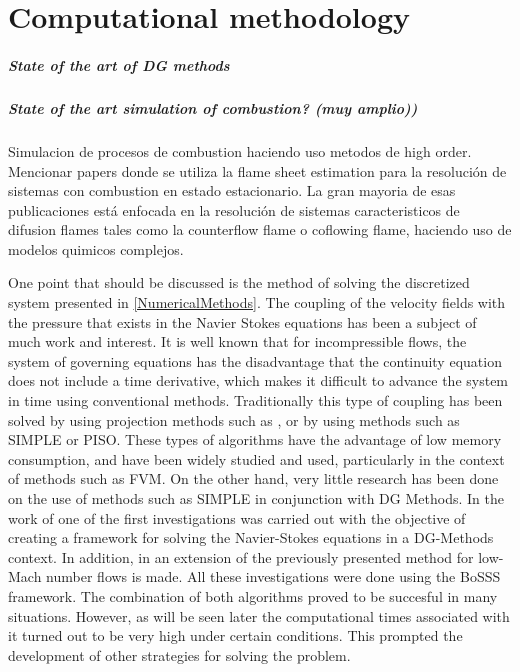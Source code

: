\chapter{Computational methodology} \label{ch:CompMethodology}

\paragraph{State of the art of DG methods}

\paragraph{State of the art simulation of combustion? (muy amplio))}
Simulacion de procesos de combustion haciendo uso metodos de high order. Mencionar papers donde se utiliza la flame sheet estimation para la resolución de sistemas con combustion en estado estacionario. La gran mayoria de esas publicaciones está enfocada en la resolución de sistemas caracteristicos de difusion flames tales como la counterflow flame o coflowing flame, haciendo uso de modelos quimicos complejos. 



One point that should be discussed is the method of solving the discretized system presented in \cref{NumericalMethods}. The coupling of the velocity fields with the pressure that exists in the Navier Stokes equations has been a subject of much work and interest. It is well known that for incompressible flows, the system of governing equations has the disadvantage that the continuity equation does not include a time derivative, which makes it difficult to advance the system in time using conventional methods. Traditionally this type of coupling has been solved by using projection methods such as \parencite{chorinNumericalSolutionNavierStokes1967}, or by using methods such as SIMPLE \parencite{patankarNumericalHeatTransfer1980} or PISO. These types of algorithms have the advantage of low memory consumption, and have been widely studied and used, particularly in the context of methods such as FVM. On the other hand, very little research has been done on the use of methods such as SIMPLE in conjunction with DG Methods. In the work of \textcite{kleinSIMPLEBasedDiscontinuous2013} one of the first investigations was carried out with the objective of creating a framework for solving the Navier-Stokes equations in a DG-Methods context. In addition, in \parencite{kleinHighorderDiscontinuousGalerkin2016} an extension of the previously presented method for low-Mach number flows is made. All these investigations were done using the BoSSS framework. The combination of both algorithms proved to be succesful in many situations. However, as will be seen later the computational times associated with it turned out to be very high under certain conditions. This prompted the development of other strategies for solving the problem. 


